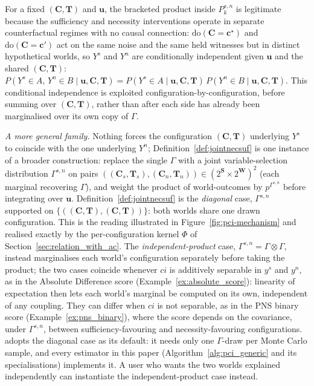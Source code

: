 For a fixed $(\mathbf{C},\mathbf{T})$ and $\mathbf{u}$, the bracketed product inside
$P_k^{s,n}$ is legitimate because the sufficiency and necessity interventions operate
in separate counterfactual regimes with no causal connection:
$\mathrm{do}(\mathbf{C}=\mathbf{c}^\star)$ and $\mathrm{do}(\mathbf{C}=\mathbf{c}')$ act
on the same noise and the same held witnesses but in distinct hypothetical worlds, so
$Y^s$ and $Y^n$ are conditionally independent given $\mathbf{u}$ and the shared
$(\mathbf{C},\mathbf{T})$:
$P(Y^s\in A,\,Y^n\in B\mid\mathbf{u},\mathbf{C},\mathbf{T})=
P(Y^s\in A\mid\mathbf{u},\mathbf{C},\mathbf{T})\,
P(Y^n\in B\mid\mathbf{u},\mathbf{C},\mathbf{T})$.
This conditional independence is exploited configuration-by-configuration, before
summing over $(\mathbf{C},\mathbf{T})$, rather than after each side has already been
marginalised over its own copy of $\Gamma$.

\medskip\noindent\textit{A more general family.} Nothing forces the configuration
$(\mathbf{C},\mathbf{T})$ underlying $Y^s$ to coincide with the one underlying $Y^n$;
Definition~\ref{def:jointnecsuf} is one instance of a broader construction: replace
the single $\Gamma$ with a joint variable-selection distribution $\Gamma^{s,n}$ on
pairs
$((\mathbf{C}_s,\mathbf{T}_s),(\mathbf{C}_n,\mathbf{T}_n))\in(2^{\mathbf{S}}\times2^{\mathbf{W}})^2$
(each marginal recovering $\Gamma$), and weight the product of world-outcomes by
$p^{\Gamma^{s,n}}$ before integrating over $\mathbf{u}$. Definition~\ref{def:jointnecsuf}
is the \emph{diagonal} case, $\Gamma^{s,n}$ supported on
$\{((\mathbf{C},\mathbf{T}),(\mathbf{C},\mathbf{T}))\}$: both worlds share one drawn
configuration. This is the reading illustrated in Figure~\ref{fig:pci-mechanism} and
realised exactly by the per-configuration kernel $\Phi$ of
Section~\ref{sec:relation_with_ac}. The \emph{independent-product} case,
$\Gamma^{s,n}=\Gamma\otimes\Gamma$, instead marginalises each world's configuration
separately before taking the product; the two cases coincide whenever $ci$ is
additively separable in $y^s$ and $y^n$, as in the Absolute Difference score
(Example~\ref{ex:absolute_score}): linearity of expectation then lets each world's
marginal be computed on its own, independent of any coupling. They can differ when
$ci$ is not separable, as in the PNS binary score (Example~\ref{ex:pns_binary}), where
the score depends on the covariance, under $\Gamma^{s,n}$, between
sufficiency-favouring and necessity-favouring configurations. \Ourapproach{} adopts
the diagonal case as its default: it needs only one $\Gamma$-draw per Monte Carlo
sample, and every estimator in this paper (Algorithm~\ref{alg:pci_generic} and its specialisations) implements it. A user who wants
the two worlds explained independently can instantiate the independent-product case
instead.

